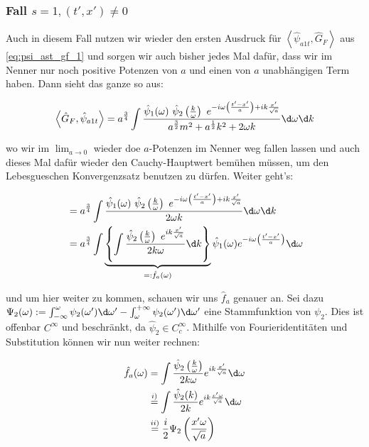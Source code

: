 \subsubsection*{Fall $s = 1, (t', x') \neq 0$}
Auch in diesem Fall nutzen wir wieder den ersten Ausdruck für
$\left< \hat\psi_{a1t}, \hat G_F \right>$ aus \eqref{eq:psi_ast_gf_1} und sorgen
wir auch bisher jedes Mal dafür, dass wir im Nenner nur noch positive Potenzen von
$a$ und einen von $a$ unabhängigen Term haben. Dann sieht das ganze so aus:

\begin{equation*}
    \left< \hat G_F, \hat\psi_{a1t} \right>
    =
    a^{\frac{3}{4}} \int \frac{\hat \psi_1(\omega)
    ~\hat\psi_2 \left(\frac{k}{\omega}\right)
    ~ e^{-i \omega \left(\frac{t'-x'}{a}\right) + i k \frac{x'}{\sqrt{a}}}
    }
    {
        a^{\frac{3}{2}} m^2 + a^{\frac{1}{2}} k^2 + 2 \omega k
    }
    \d \omega \d k
\end{equation*}

wo wir im $\lim_{a \rightarrow 0}$ wieder doe $a$-Potenzen im Nenner weg fallen lassen
und auch dieses Mal dafür wieder den Cauchy-Hauptwert bemühen müssen, um den
Lebesgueschen Konvergenzsatz benutzen zu dürfen.
Weiter geht's:

\begin{align}
    &=
    a^{\frac{3}{4}} \int \frac{
    \hat \psi_1(\omega)
    ~\hat\psi_2 \left(\frac{k}{\omega}\right)
    ~ e^{-i \omega \left(\frac{t'-x'}{a}\right) + i k \frac{x'}{\sqrt{a}}}
    }
    {
    2\omega k
    } \d \omega \d k \nonumber \\
    &= a^{\frac{3}{4}} \int
    \underbrace{\left\{ \int \frac{\hat \psi_2\left(\frac{k}{\omega}\right)
        ~e^{ik\frac{x'}{\sqrt{a}}}
        }
        {
            2 k \omega
        }
        \d k
        \right\}}_{=: \hat f_a (\omega)}
    \hat \psi_1(\omega) e^{-i \omega \left(\frac{t'-x'}{a}\right)}
    \d \omega
\end{align}

und um hier weiter zu kommen, schauen wir uns $\hat f_a$ genauer an. Sei dazu
$\Psi_2(\omega) := \int_{-\infty}^\omega \psi_2(\omega ') \d \omega '
    -  \int_{\omega}^{+ \infty} \psi_2(\omega ') \d \omega '$ eine
Stammfunktion von $\psi_2$. Dies ist offenbar $C^\infty$ und beschränkt, da
 $\hat \psi_2 \in C^\infty_c$. Mithilfe von Fourieridentitäten und Substitution können wir nun weiter rechnen:

\begin{align*}
    \hat f_a (\omega) &=
    \int \frac{\hat \psi_2\left(\frac{k}{\omega}\right)}{2k\omega}
    e^{i k \frac{x'}{\sqrt{a}}}
    \d \omega \\
    &\stackrel{i)}{=}
    \int \frac{\hat \psi_2 (k)}{2k}e^{ik\frac{x' \omega}{\sqrt{a}}}
    \d \omega \\
    &\stackrel{ii)}{=} \frac{i}{2}  \Psi_2\left(\frac{x' \omega}{\sqrt{a}}\right)
\end{align*}

